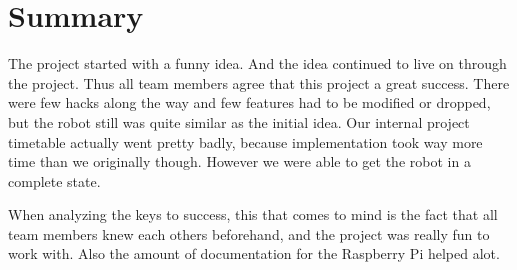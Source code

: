 \documentclass[english,11pt,twoside,a4paper]{article}
\begin{document}
\section{Summary}

The project started with a funny idea. And the idea continued to live on through the project. Thus all team members agree that this project a great success. There were few hacks along the way and few features had to be modified or dropped, but the robot still was quite similar as the initial idea. Our internal project timetable actually went pretty badly, because implementation took way more time than we originally though. However we were able to get the robot in a complete state.

When analyzing the keys to success, this that comes to mind is the fact that all team members knew each others beforehand, and the project was really fun to work with. Also the amount of documentation for the Raspberry Pi helped alot.
\end{document}
